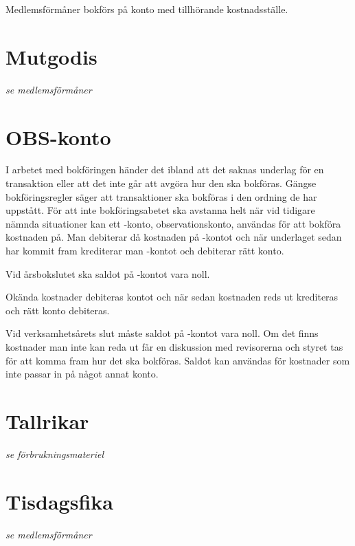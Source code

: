 					\begin{redovisning}
						Medlemsförmåner bokförs på konto  med tillhörande kostnadsställe.
					\end{redovisning}
				
				\section{Mutgodis}
				\emph{se medlemsförmåner}
			
				\section{OBS-konto}
				
				I arbetet med bokföringen händer det ibland att det saknas underlag för en transaktion eller att det inte går att avgöra hur den ska bokföras. Gängse bokföringsregler  säger att transaktioner ska bokföras i den ordning de har uppstått. För att inte bokföringsabetet ska avstanna helt när vid tidigare nämnda situationer kan ett -konto, observationskonto, användas för att bokföra kostnaden på. Man debiterar då kostnaden på -kontot och när underlaget sedan har kommit fram krediterar man -kontot och debiterar rätt konto.
		
		Vid årsbokslutet ska saldot på -kontot vara noll.
		
					\begin{redovisning}
						Okända kostnader debiteras kontot  och när sedan kostnaden reds ut krediteras  och rätt konto debiteras.
					\end{redovisning}
				
					\begin{bokslut}
						Vid verksamhetsårets slut måste saldot på -kontot vara noll. Om det finns kostnader man inte kan reda ut får en diskussion med revisorerna och styret tas för att komma fram hur det ska bokföras. Saldot  kan användas för kostnader som inte passar in på något annat konto.
					\end{bokslut}
				
				\section{Tallrikar}
				\emph{se förbrukningsmateriel}
			
				\section{Tisdagsfika}
				\emph{se medlemsförmåner}
			
